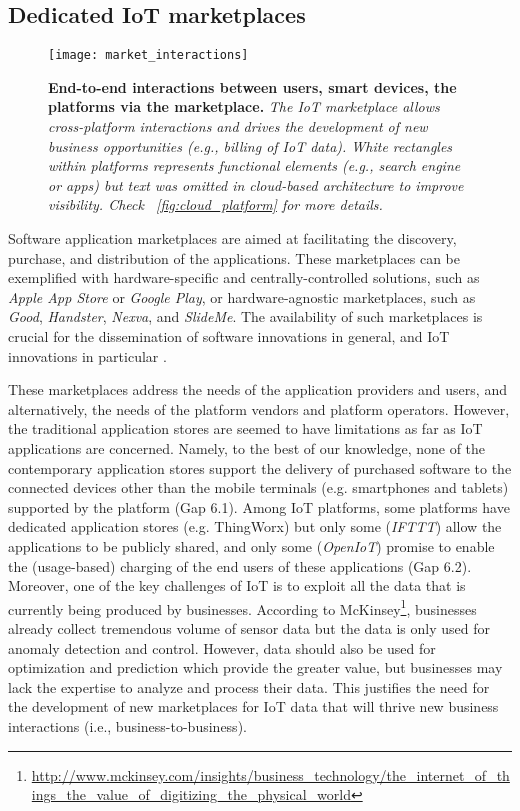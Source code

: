 \documentclass[preprint,10pt,5p]{elsarticle}
\begin{document}
\subsection{Dedicated IoT marketplaces}\label{sec:marketplace}
\label{sec:gap_marketplace}

\begin{figure}[t]
 \centering
 \texttt{[image: market\_interactions]}
 \caption{
 	\textbf{End-to-end interactions between users, smart devices, the platforms via the marketplace.}
 	\textsl{The IoT marketplace allows cross-platform interactions and drives the development of new 
    business opportunities (e.g., billing of IoT data). White rectangles within platforms represents 
    functional elements (e.g., search engine or apps) but text was omitted in cloud-based architecture to improve visibility. 
    Check \figurename~\ref{fig:cloud_platform} for more details.}
 }
 \label{fig:market_interactions}
\end{figure}

Software application marketplaces are aimed at facilitating the discovery,
purchase, and distribution of the applications. 
These marketplaces can be exemplified with hardware-specific and
centrally-controlled solutions, such as \emph{Apple App Store} or \emph{Google
Play}, or hardware-agnostic marketplaces, such as \emph{Good}, \emph{Handster},
\emph{Nexva}, and \emph{SlideMe}. 
The availability of such marketplaces is crucial for the dissemination of
software innovations in general, and IoT innovations in particular
\cite{Kortuem2010}.  

These marketplaces address the needs of the application providers and
users, and alternatively, the needs of the platform vendors and
platform operators.
However, the traditional application stores are seemed to have limitations as far as
IoT applications are concerned. 
Namely, to the best of our knowledge, none of the contemporary application
stores support the delivery of purchased software to the connected devices other
than the mobile terminals (e.g. smartphones and tablets) supported by the
platform (Gap 6.1). 
Among IoT platforms, some platforms have dedicated application stores (e.g. 
ThingWorx) but only some (\emph{IFTTT}) allow the applications to be
publicly shared, and only some (\emph{OpenIoT}) promise to enable the
(usage-based) charging of the end users of these applications (Gap 6.2).
Moreover, one of the key challenges of IoT is to exploit all the data that is currently
being produced by businesses.
According to McKinsey\footnote{\url{http://www.mckinsey.com/insights/business_technology/the_internet_of_things_the_value_of_digitizing_the_physical_world}},
businesses already collect tremendous volume of sensor data
but the data is only used for anomaly detection and control. 
However, data should also be used for optimization and prediction which provide the greater value, 
but businesses may lack the expertise to analyze and process their data.
This justifies the need for the development of new marketplaces for IoT
data that will thrive new business interactions (i.e., business-to-business).
\end{document}
